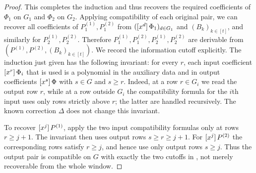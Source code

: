 \begin{proof}
    This completes the induction and thus recovers the required coefficients of $\Phi_1$ on $G_1$ and $\Phi_2$ on $G_2$.
    Applying compatibility of each original pair, we can recover all coefficients of $P^{(1)}_1,P^{(2)}_1$ from $(\coeff{\Phi_1}{d})_{d\in G_1}$ and $(B_k)_{k\in[t]}$, and similarly for $P^{(1)}_2,P^{(2)}_2$.
    Therefore $P^{(1)}_1,P^{(2)}_1,P^{(1)}_2,P^{(2)}_2$ are derivable from $(P^{(1)},P^{(2)},(B_k)_{k\in[t]})$.
    We record the information cutoff explicitly.  The induction just given has
    the following invariant: for every $r$, each input coefficient
    $\coeff{\Phi_i}{r}$ that is used is a polynomial in the auxiliary data and
    in output coefficients $\coeff{\Phi}{s}$ with $s\in G$ and $s\ge r$.
    Indeed, at a row $r\in G_i$ we read the output row $r$, while at a row
    outside $G_i$ the compatibility formula for the $i$th input uses only
    rows strictly above $r$; the latter are handled recursively.  The known
    correction $\Delta$ does not change this invariant.

    To recover $\coeff{P^{(1)}}{j}$, apply the two input compatibility formulas
    only at rows $r\ge j+1$.  The invariant then uses output rows $s\ge r\ge
    j+1$.  For $\coeff{P^{(2)}}{j}$ the corresponding rows satisfy $r\ge j$,
    and hence use only output rows $s\ge j$.  Thus the output pair is
    compatible on $G$ with exactly the two cutoffs in
    , not merely recoverable from the whole window.
\end{proof}

